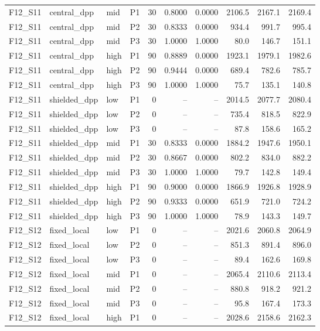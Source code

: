 \begin{longtable}{llllrrrrrr}
F12\_S11 & central\_dpp & mid & P1 & 30 & 0.8000 & 0.0000 & 2106.5 & 2167.1 & 2169.4 \\
F12\_S11 & central\_dpp & mid & P2 & 30 & 0.8333 & 0.0000 & 934.4 & 991.7 & 995.4 \\
F12\_S11 & central\_dpp & mid & P3 & 30 & 1.0000 & 1.0000 & 80.0 & 146.7 & 151.1 \\
F12\_S11 & central\_dpp & high & P1 & 90 & 0.8889 & 0.0000 & 1923.1 & 1979.1 & 1982.6 \\
F12\_S11 & central\_dpp & high & P2 & 90 & 0.9444 & 0.0000 & 689.4 & 782.6 & 785.7 \\
F12\_S11 & central\_dpp & high & P3 & 90 & 1.0000 & 1.0000 & 75.7 & 135.1 & 140.8 \\
F12\_S11 & shielded\_dpp & low & P1 & 0 & -- & -- & 2014.5 & 2077.7 & 2080.4 \\
F12\_S11 & shielded\_dpp & low & P2 & 0 & -- & -- & 735.4 & 818.5 & 822.9 \\
F12\_S11 & shielded\_dpp & low & P3 & 0 & -- & -- & 87.8 & 158.6 & 165.2 \\
F12\_S11 & shielded\_dpp & mid & P1 & 30 & 0.8333 & 0.0000 & 1884.2 & 1947.6 & 1950.1 \\
F12\_S11 & shielded\_dpp & mid & P2 & 30 & 0.8667 & 0.0000 & 802.2 & 834.0 & 882.2 \\
F12\_S11 & shielded\_dpp & mid & P3 & 30 & 1.0000 & 1.0000 & 79.7 & 142.8 & 149.4 \\
F12\_S11 & shielded\_dpp & high & P1 & 90 & 0.9000 & 0.0000 & 1866.9 & 1926.8 & 1928.9 \\
F12\_S11 & shielded\_dpp & high & P2 & 90 & 0.9333 & 0.0000 & 651.9 & 721.0 & 724.2 \\
F12\_S11 & shielded\_dpp & high & P3 & 90 & 1.0000 & 1.0000 & 78.9 & 143.3 & 149.7 \\
F12\_S12 & fixed\_local & low & P1 & 0 & -- & -- & 2021.6 & 2060.8 & 2064.9 \\
F12\_S12 & fixed\_local & low & P2 & 0 & -- & -- & 851.3 & 891.4 & 896.0 \\
F12\_S12 & fixed\_local & low & P3 & 0 & -- & -- & 89.4 & 162.6 & 169.8 \\
F12\_S12 & fixed\_local & mid & P1 & 0 & -- & -- & 2065.4 & 2110.6 & 2113.4 \\
F12\_S12 & fixed\_local & mid & P2 & 0 & -- & -- & 880.8 & 918.2 & 921.2 \\
F12\_S12 & fixed\_local & mid & P3 & 0 & -- & -- & 95.8 & 167.4 & 173.3 \\
F12\_S12 & fixed\_local & high & P1 & 0 & -- & -- & 2028.6 & 2158.6 & 2162.3 \\

\end{longtable}
